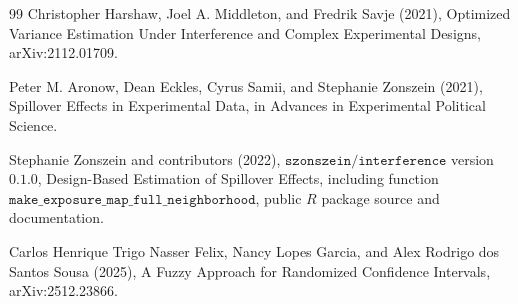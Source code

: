 \documentclass{article}
\begin{document}
\begin{thebibliography}{99}
   Christopher Harshaw, Joel A. Middleton, and Fredrik Savje (2021), Optimized Variance Estimation Under Interference and Complex Experimental Designs, arXiv:2112.01709.

   Peter M. Aronow, Dean Eckles, Cyrus Samii, and Stephanie Zonszein (2021), Spillover Effects in Experimental Data, in Advances in Experimental Political Science.

   Stephanie Zonszein and contributors (2022), \(\texttt{szonszein/interference}\) version \(0.1.0\), Design-Based Estimation of Spillover Effects, including function \(\texttt{make\_exposure\_map\_full\_neighborhood}\), public \(R\) package source and documentation.

   Carlos Henrique Trigo Nasser Felix, Nancy Lopes Garcia, and Alex Rodrigo dos Santos Sousa (2025), A Fuzzy Approach for Randomized Confidence Intervals, arXiv:2512.23866.

\end{thebibliography}
\end{document}
